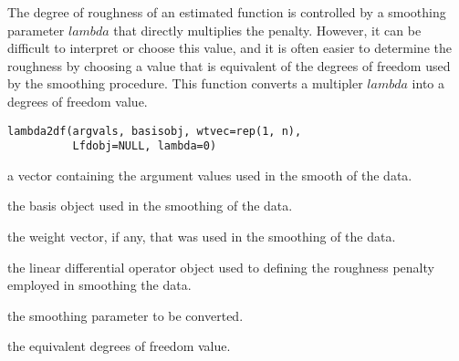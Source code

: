 \documentclass{article}
\begin{document}
\begin{Description}\relax
The degree of roughness of an estimated function is controlled by a
smoothing parameter $lambda$ that directly multiplies the penalty.
However, it can be difficult to interpret or choose this value, and it
is often easier to determine the roughness by choosing a value that is
equivalent of the degrees of freedom used by the smoothing procedure.
This function converts a multipler $lambda$ into a degrees of freedom value.
\end{Description}
\begin{Usage}
\begin{verbatim}
lambda2df(argvals, basisobj, wtvec=rep(1, n),
          Lfdobj=NULL, lambda=0)
\end{verbatim}
\end{Usage}
\begin{Arguments}
\begin{ldescription}
\item[\code{argvals}] a vector containing the argument values used in the
smooth of the data.

\item[\code{basisobj}] the basis object used in the smoothing of the data.

\item[\code{wtvec}] the weight vector, if any, that was used in the smoothing
of the data.

\item[\code{Lfdobj}] the linear differential operator object used to defining
the roughness penalty employed in smoothing the data.

\item[\code{lambda}] the smoothing parameter to be converted.

\end{ldescription}
\end{Arguments}
\begin{Value}
the equivalent degrees of freedom value.
\end{Value}
\begin{SeeAlso}\relax
{}
\end{SeeAlso}
\end{document}
